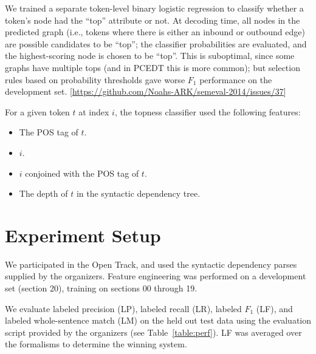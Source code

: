 \documentclass[11pt]{article}
\newcommand{\codenote}[1]{\textcolor{PineGreen}{[#1]}}
\begin{document}
We trained a separate token-level binary logistic regression to classify
whether a token's node had the ``top'' attribute or not.
At decoding time, all nodes in the predicted graph (i.e., tokens where there is
either an inbound or outbound edge) are possible candidates to be ``top'';
the classifier probabilities are evaluated, and the highest-scoring node is
chosen to be ``top''.
This is suboptimal, since some graphs have multiple tops (and in PCEDT this is
more common);
but selection rules based on probability thresholds gave worse $F_1$
performance on the development set. \codenote{\url{https://github.com/Noahs-ARK/semeval-2014/issues/37}}

For a given token $t$ at index $i$, the topness classifier used the following
features:
\begin{itemize}
\item The POS tag of $t$.
\item $i$.
\item $i$ conjoined with the POS tag of $t$.
\item The depth of $t$ in the syntactic dependency tree. 
\end{itemize}

\section{Experiment Setup}
\label{s:evaluation}

We participated in the Open Track, and used the syntactic dependency parses supplied by the organizers.  Feature engineering was performed on a development set (section 20), training on sections 00 through 19.


We evaluate labeled precision (LP), labeled recall (LR), labeled $F_1$ (LF), and
labeled whole-sentence match (LM) on the held out test data using the
evaluation script provided by the organizers (see Table~\ref{table:perf}).
LF was averaged over the formalisms to determine the winning system.

% 
% 
% 
% 

% 
% 
\end{document}

